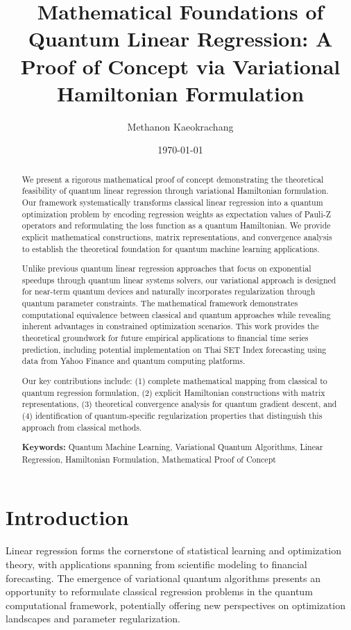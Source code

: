 \documentclass[11pt]{article}
\title{Mathematical Foundations of Quantum Linear Regression: A Proof of Concept via Variational Hamiltonian Formulation}
\author{Methanon Kaeokrachang}
\affil{Bangkok, Thailand}
\date{\today}
\begin{document}
\maketitle

\begin{abstract}
We present a rigorous mathematical proof of concept demonstrating the theoretical feasibility of quantum linear regression through variational Hamiltonian formulation. Our framework systematically transforms classical linear regression into a quantum optimization problem by encoding regression weights as expectation values of Pauli-Z operators and reformulating the loss function as a quantum Hamiltonian. We provide explicit mathematical constructions, matrix representations, and convergence analysis to establish the theoretical foundation for quantum machine learning applications. 

Unlike previous quantum linear regression approaches that focus on exponential speedups through quantum linear systems solvers, our variational approach is designed for near-term quantum devices and naturally incorporates regularization through quantum parameter constraints. The mathematical framework demonstrates computational equivalence between classical and quantum approaches while revealing inherent advantages in constrained optimization scenarios. This work provides the theoretical groundwork for future empirical applications to financial time series prediction, including potential implementation on Thai SET Index forecasting using data from Yahoo Finance and quantum computing platforms.

Our key contributions include: (1) complete mathematical mapping from classical to quantum regression formulation, (2) explicit Hamiltonian constructions with matrix representations, (3) theoretical convergence analysis for quantum gradient descent, and (4) identification of quantum-specific regularization properties that distinguish this approach from classical methods.

\textbf{Keywords:} Quantum Machine Learning, Variational Quantum Algorithms, Linear Regression, Hamiltonian Formulation, Mathematical Proof of Concept
\end{abstract}

\section{Introduction}

Linear regression forms the cornerstone of statistical learning and optimization theory, with applications spanning from scientific modeling to financial forecasting. The emergence of variational quantum algorithms presents an opportunity to reformulate classical regression problems in the quantum computational framework, potentially offering new perspectives on optimization landscapes and parameter regularization.
\end{document}
